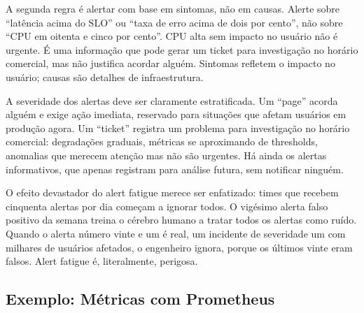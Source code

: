 A segunda regra é alertar com base em sintomas, não em causas. Alerte sobre
``latência acima do SLO'' ou ``taxa de erro acima de dois por cento'', não sobre
``CPU em oitenta e cinco por cento''. CPU alta sem impacto no usuário não é
urgente. É uma informação que pode gerar um ticket para investigação no horário
comercial, mas não justifica acordar alguém. Sintomas refletem o impacto no
usuário; causas são detalhes de infraestrutura.

A severidade dos alertas deve ser claramente estratificada. Um ``page'' acorda
alguém e exige ação imediata, reservado para situações que afetam usuários
em produção agora. Um ``ticket'' registra um problema para investigação no
horário comercial: degradações graduais, métricas se aproximando de
thresholds, anomalias que merecem atenção mas não são urgentes. Há ainda os alertas
informativos, que apenas registram para análise futura, sem notificar ninguém.

O efeito devastador do alert fatigue merece ser enfatizado: times que recebem
cinquenta alertas por dia começam a ignorar todos. O vigésimo alerta falso
positivo da semana treina o cérebro humano a tratar todos os alertas como
ruído. Quando o alerta número vinte e um é real, um incidente de severidade
um com milhares de usuários afetados, o engenheiro ignora, porque os
últimos vinte eram falsos. Alert fatigue é, literalmente, perigosa.

\subsection{Exemplo: Métricas com Prometheus}

